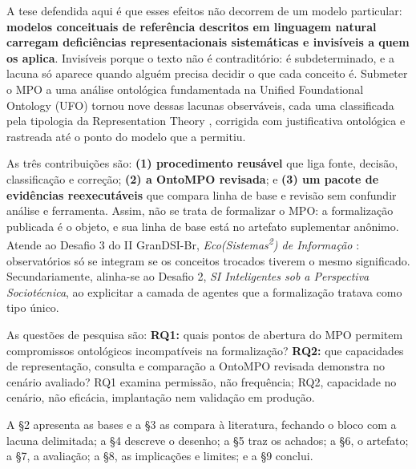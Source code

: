 A tese defendida aqui é que esses efeitos não decorrem de um modelo particular: \textbf{modelos conceituais de referência descritos em linguagem natural carregam deficiências representacionais sistemáticas e invisíveis a quem os aplica}. Invisíveis porque o texto não é contraditório: é subdeterminado, e a lacuna só aparece quando alguém precisa decidir o que cada conceito é. Submeter o MPO a uma análise ontológica fundamentada na Unified Foundational Ontology (UFO) tornou nove dessas lacunas observáveis, cada uma classificada pela tipologia da Representation Theory \cite{wand1993ontological}, corrigida com justificativa ontológica e rastreada até o ponto do modelo que a permitiu.

As três contribuições são: \textbf{(1) procedimento reusável} que liga fonte, decisão, classificação e correção; \textbf{(2) a OntoMPO revisada}; e \textbf{(3) um pacote de evidências reexecutáveis} que compara linha de base e revisão sem confundir análise e ferramenta. Assim, não se trata de formalizar o MPO: a formalização publicada é o objeto, e sua linha de base está no artefato suplementar anônimo. Atende ao Desafio 3 do II GranDSI-Br, \textit{Eco(Sistemas\textsuperscript{2}) de Informação} \cite{araujo2025grandsi}: observatórios só se integram se os conceitos trocados tiverem o mesmo significado. Secundariamente, alinha-se ao Desafio 2, \textit{SI Inteligentes sob a Perspectiva Sociotécnica}, ao explicitar a camada de agentes que a formalização tratava como tipo único.

As questões de pesquisa são: \textbf{RQ1:} quais pontos de abertura do MPO permitem compromissos ontológicos incompatíveis na formalização? \textbf{RQ2:} que capacidades de representação, consulta e comparação a OntoMPO revisada demonstra no cenário avaliado? RQ1 examina permissão, não frequência; RQ2, capacidade no cenário, não eficácia, implantação nem validação em produção.

A \S{}2 apresenta as bases e a \S{}3 as compara à literatura, fechando o bloco com a lacuna delimitada; a \S{}4 descreve o desenho; a \S{}5 traz os achados; a \S{}6, o artefato; a \S{}7, a avaliação; a \S{}8, as implicações e limites; e a \S{}9 conclui.

